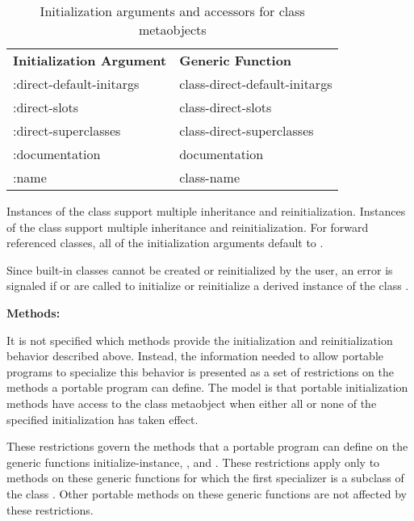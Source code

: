 \begin{table}[t]
\caption{Initialization arguments and accessors for class
metaobjects}
\label{INITARGS-ACCESSORS-FOR-CLASS-METAOBJECT}
\begin{flushleft}
\cf
\begin{tabular}{@{}ll@{}}
\textbf{Initialization Argument}&\textbf{Generic Function}\\
:direct-default-initargs&class-direct-default-initargs\\
:direct-slots&class-direct-slots\\
:direct-superclasses&class-direct-superclasses\\
:documentation&documentation\\
:name&class-name\\
\end{tabular}
\end{flushleft}
\end{table}

Instances of the class  support multiple inheritance and
reinitialization. Instances of the class  support
multiple inheritance and reinitialization. For forward referenced classes, all
of the initialization arguments default to .

Since built-in classes cannot be created or reinitialized by the user, an error
is signaled if  or  are
called to initialize or reinitialize a derived instance of the class
.

\textbf{Methods:}

It is not specified which methods provide the initialization and
reinitialization behavior described above. Instead, the information needed to
allow portable programs to specialize this behavior is presented as a set of
restrictions on the methods a portable program can define. The model is that
portable initialization methods have access to the class metaobject when either
all or none of the specified initialization has taken effect.

These restrictions govern the methods that a portable program can define on the
generic functions initialize-instance, , and
. These restrictions apply only to methods on these generic
functions for which the first specializer is a subclass of the class
. Other portable methods on these generic functions are not affected by
these restrictions.

